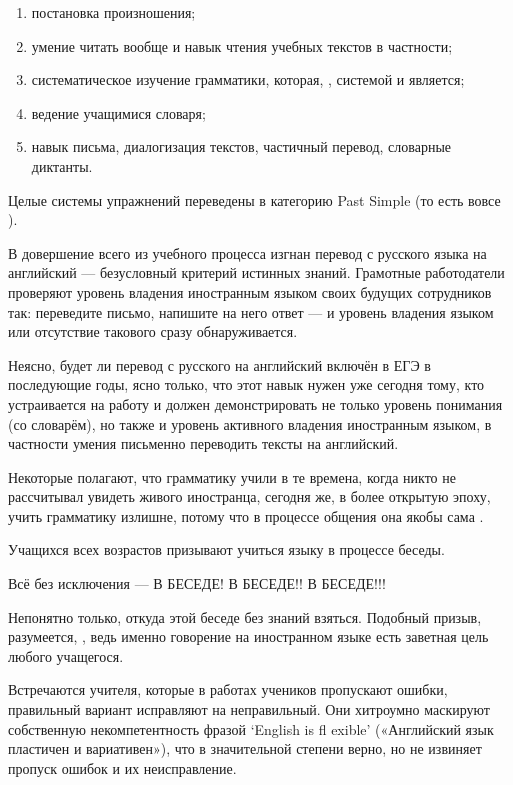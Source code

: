 \begin{enumerate}
    \item постановка произношения;
    \item умение читать вообще и навык чтения учебных текстов в частности;
    \item систематическое изучение грамматики, которая, , системой и является;
    \item ведение учащимися словаря;
    \item навык письма, диалогизация текстов, частичный перевод, словарные диктанты.
\end{enumerate}

Целые системы упражнений переведены в категорию Past Simple (то есть вовсе ).

В довершение всего из учебного процесса изгнан перевод с русского языка на английский --- безусловный критерий истинных знаний. Грамотные работодатели проверяют уровень владения иностранным языком своих будущих сотрудников так: переведите письмо, напишите на него ответ --- и уровень владения языком или отсутствие такового сразу обнаруживается.

Неясно, будет ли перевод с русского на английский включён в ЕГЭ в последующие годы, ясно только, что этот навык нужен уже сегодня тому, кто устраивается на работу и должен демонстрировать не только уровень понимания (со словарём), но также и уровень активного владения иностранным языком, в частности умения письменно переводить тексты на английский.

Некоторые полагают, что грамматику учили в те времена, когда никто не рассчитывал увидеть живого иностранца, сегодня же, в более открытую эпоху, учить грамматику излишне, потому что в процессе общения она якобы сама .

Учащихся всех возрастов призывают учиться языку в процессе беседы.

Всё без исключения --- В БЕСЕДЕ! В БЕСЕДЕ!! В БЕСЕДЕ!!!

Непонятно только, откуда этой беседе без знаний взяться. Подобный призыв, разумеется, , ведь именно говорение на иностранном языке есть заветная цель любого учащегося.

Встречаются учителя, которые в работах учеников пропускают ошибки, правильный вариант исправляют на неправильный. Они хитроумно маскируют собственную некомпетентность фразой ‘English is fl exible’ («Английский язык пластичен и вариативен»), что в значительной степени верно, но не извиняет пропуск ошибок и их неисправление.

